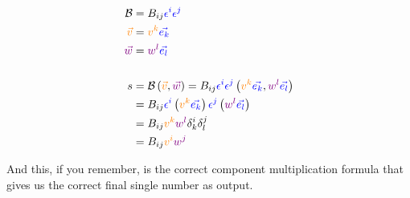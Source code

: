 \begin{align*}
    \mathcal{B} &= B_{ij} \begingroup\color{blue} \epsilon^i \epsilon^j \endgroup\\
    \begingroup\color{orange}\vec{v}\endgroup &= \begingroup\color{orange} v^k\endgroup \begingroup\color{blue} \vec{e_k}\endgroup\\
    \begingroup\color{violet}\vec{w}\endgroup &= \begingroup\color{violet} w^l\endgroup \begingroup\color{blue} \vec{e_l}\endgroup\\ \\
    s &= \mathcal{B} \left(\begingroup\color{orange}\vec{v}\endgroup, \begingroup\color{violet}\vec{w}\endgroup\right) = B_{ij} \begingroup\color{blue}\epsilon^i \epsilon^j \endgroup \left(\begingroup\color{orange} v^k\endgroup \begingroup\color{blue} \vec{e_k}\endgroup, \begingroup\color{violet} w^l\endgroup \begingroup\color{blue} \vec{e_l}\endgroup\right)\\
    &= B_{ij} \begingroup\color{blue}\epsilon^i \endgroup \left(\begingroup\color{orange} v^k\endgroup \begingroup\color{blue} \vec{e_k}\endgroup\right) \begingroup\color{blue}\epsilon^j \endgroup \left(\begingroup\color{violet} w^l\endgroup \begingroup\color{blue} \vec{e_l}\endgroup\right)\\
    &= B_{ij} \begingroup\color{orange} v^k\endgroup \begingroup\color{violet} w^l\endgroup \delta^i_k \delta^j_l\\
    &= B_{ij} \begingroup\color{orange} v^i\endgroup \begingroup\color{violet} w^j\endgroup
\end{align*}

And this, if you remember, is the correct component multiplication formula that gives us the correct final single number as output.
